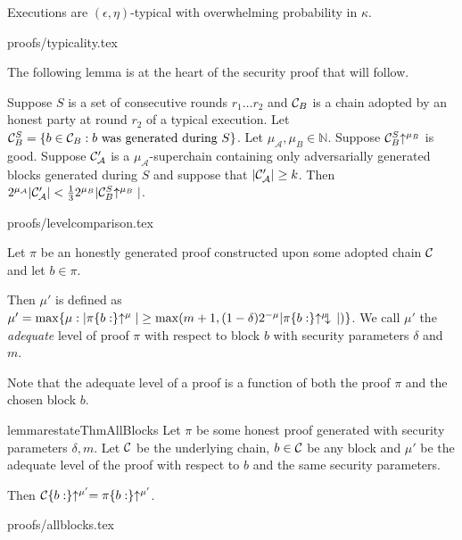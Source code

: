 \begin{theorem}[Typicality]
\label{thm.typicality}
Executions are $(\epsilon, \eta)$-typical with overwhelming
probability in $\kappa$.
\end{theorem}
{proofs/typicality.tex}

The following lemma is at the heart of the security proof that will follow.

\begin{lemma}\label{lem.level-comparison}
    Suppose $S$ is a set of consecutive rounds $r_1 \ldots r_2$
    and $\mathcal{C}_B$ is
    a chain adopted by an honest party at round $r_2$ of a typical execution.
    Let $\mathcal{C}_B^S = \{b \in
    \mathcal{C}_B: b \textnormal{ was generated during } S\}$. Let $\mu_\mathcal{A},
    \mu_B \in \mathbb{N}$. Suppose $\mathcal{C}_B^S\negthickspace\uparrow^{\mu_B}$ is good.
    Suppose $\mathcal{C}'_\mathcal{A}$ is a $\mu_\mathcal{A}$-superchain containing
    only adversarially generated blocks generated during $S$ and suppose that
    $|\mathcal{C}'_\mathcal{A}| \geq k$.
    Then
    $2^{\mu_\mathcal{A}}|\mathcal{C}'_\mathcal{A}| < \frac{1}{3}2^{\mu_B}|\mathcal{C}_B^S\negthickspace\uparrow^{\mu_B}|$.
\end{lemma}
{proofs/levelcomparison.tex}

\begin{definition}
Let $\pi$ be an honestly generated proof constructed upon some adopted chain
$\mathcal{C}$ and let $b \in \pi$.

Then $\mu'$ is defined as  $\mu' = \max\{\mu: |\pi\{b:\}\negthickspace\uparrow^\mu| \geq
\max(m + 1, (1 - \delta)2^{-\mu}|\pi\{b:\}\negthickspace\uparrow^\mu\negthickspace\downarrow\,|)\}$.
We call $\mu'$ the \textit{adequate} level of proof $\pi$ with respect to
block $b$ with security parameters $\delta$ and $m$.
\end{definition}

Note that the adequate level of a proof is a function of both the proof $\pi$
and the chosen block $b$.

\begin{restatable}{lemma}{restateThmAllBlocks}\label{lem.allblocks}
Let $\pi$ be some honest proof generated with security parameters $\delta, m$.
Let $\mathcal{C}$ be the underlying chain, $b \in \mathcal{C}$ be any block and $\mu'$ be
the adequate level of the proof with respect to $b$ and the same security
parameters.

Then $\mathcal{C}\{b:\}\negthickspace\uparrow^{\mu'} = \pi\{b:\}\negthickspace\uparrow^{\mu'}$.
\end{restatable}
{proofs/allblocks.tex}

